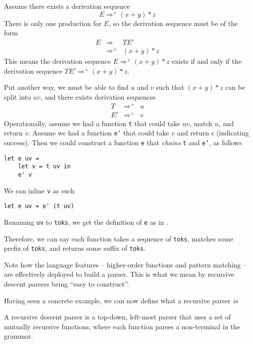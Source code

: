 Assume there exists a derivation sequence
\[E \Rightarrow^{+} (x+y) * z\]
There is only one production for $E$, so the derivation sequence must be of the form
\[
\begin{array}{rll}
E&\Rightarrow&TE'\\
&{\Rightarrow^{+}}&(x+y) * z
\end{array}
\]
This means the derivation sequence $E \Rightarrow^{+} (x+y) * z$ exists if and only if the derivation sequence $TE' \Rightarrow^{+} (x+y) * z$.

Put another way, we must be able to find $u$ and $v$ such that $(x + y) * z$ can be split into $uv$, and there exists derivation sequences
\[
\begin{array}{rcl}
T&{\Rightarrow^{+}}&u\\
{E'}&{\Rightarrow^{+}}&v
\end{array}
\]
Operationally, assume we had a function \texttt{t} that could take $uv$, match $u$, and return $v$. Assume we had a function \texttt{e'} that could take $v$ and return $\epsilon$ (indicating success). Then we could construct a function \texttt{e} that \textit{chains} \texttt{t} and \texttt{e'}, as follows
\begin{verbatim}
let e uv =
    let v = t uv in
    e' v
\end{verbatim}
We can inline \texttt{v} as such
\begin{verbatim}
let e uv = e' (t uv)
\end{verbatim}
Renaming \texttt{uv} to \texttt{toks}, we get the definition of \texttt{e} as in .

Therefore, we can say each function takes a sequence of \texttt{toks}, matches some prefix of \texttt{toks}, and returns some suffix of \texttt{toks}.

Note how the language features -- higher-order functions and pattern matching -- are effectively deployed to build a parser. This is what we mean by recursive descent parsers being ``easy to construct''.

Having seen a concrete example, we can now define what a recursive parser \textit{is}

\begin{definition}
    A recursive descent parser is a top-down, left-most parser that uses a set of mutually recursive functions, where each function parses a non-terminal in the grammar.
\end{definition}

